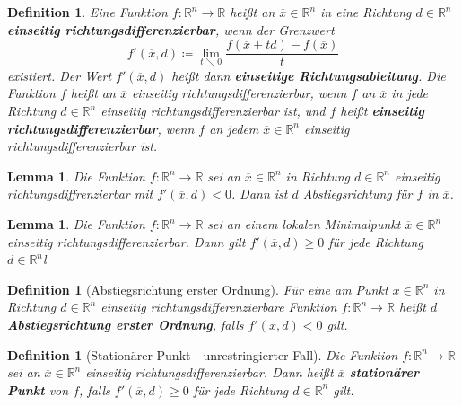 \documentclass[11pt]{scrreprt}
\newcounter{thm}
\numberwithin{thm}{section}
\newtheorem{definition}[thm]{Definition}
\newtheorem{lemma}[thm]{Lemma}
\begin{document}
\begin{definition}
	Eine Funktion $f \colon \mathbb{R}^n \rightarrow \mathbb{R}$ heißt an $\overline{x} \in \mathbb{R}^n$ in eine Richtung $d \in \mathbb{R}^n$ \textbf{einseitig richtungsdifferenzierbar}, wenn der Grenzwert
	$$ f'(\overline{x}, d) \coloneqq \lim_{t \searrow 0} \frac{f(\overline{x} + td) - f(\overline{x})}{t} $$
	existiert. Der Wert $f'(\overline{x}, d)$ heißt dann \textbf{einseitige Richtungsableitung}. Die Funktion $f$ heißt an $\overline{x}$ einseitig richtungsdifferenzierbar, wenn $f$ an $\overline{x}$ in jede Richtung $d \in \mathbb{R}^n$ einseitig richtungsdifferenzierbar ist, und $f$ heißt \textbf{einseitig richtungsdifferenzierbar}, wenn $f$ an jedem $\overline{x} \in \mathbb{R}^n$ einseitig richtungsdifferenzierbar ist.
\end{definition}

\begin{lemma}
	Die Funktion $f \colon \mathbb{R}^n \rightarrow \mathbb{R}$ sei an $\overline{x} \in \mathbb{R}^n$ in Richtung $d \in \mathbb{R}^n$ einseitig richtungsdiffrenzierbar mit $f'(\overline{x}, d) < 0$. Dann ist $d$ Abstiegsrichtung für $f$ in $\overline{x}$.	
\end{lemma}

\begin{lemma}
	Die Funktion $f \colon \mathbb{R}^n \rightarrow \mathbb{R}$ sei an einem lokalen Minimalpunkt $\overline{x} \in \mathbb{R}^n$ einseitig richtungsdifferenzierbar. Dann gilt $f'(\overline{x}, d) \geq 0$ für jede Richtung $d \in \mathbb{R}^n$l
\end{lemma}

\begin{definition}[Abstiegsrichtung erster Ordnung]
	Für eine am Punkt $\overline{x} \in \mathbb{R}^n$ in Richtung $d \in \mathbb{R}^n$ einseitig richtungsdifferenzierbare Funktion $f \colon \mathbb{R}^n \rightarrow \mathbb{R}$ heißt $d$ \textbf{Abstiegsrichtung erster Ordnung}, falls $f'(\overline{x}, d) < 0$ gilt.	
\end{definition}

\begin{definition}[Stationärer Punkt - unrestringierter Fall]
	Die Funktion $f \colon \mathbb{R}^n \rightarrow \mathbb{R}$ sei an $\overline{x} \in \mathbb{R}^n$ einseitig richtungsdifferenzierbar. Dann heißt $\overline{x}$ \textbf{stationärer Punkt} von $f$, falls $f'(\overline{x}, d) \geq 0$ für jede Richtung $d \in \mathbb{R}^n$ gilt.
\end{definition}
\end{document}
